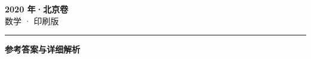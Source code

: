 \documentclass[zihao=5, a4paper]{ctexart}
\begin{document}
\begin{center}
  {\Large\bfseries 2020 年·北京卷}\\[4pt]
  {\large 数学 · 印刷版}
\end{center}
\medskip
{}

\par\bigskip\hrule\bigskip
{}
\Needspace{0.55\textheight}
\begin{center}{\large\bfseries 参考答案与详细解析}\end{center}
\smallskip

\end{document}
